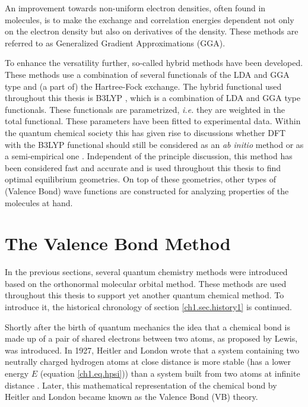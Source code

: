 An improvement towards non-uniform electron densities, often found in molecules, is to make the exchange and correlation energies dependent not only on the electron density but also on derivatives of the density. These methods are referred to as Generalized Gradient Approximations (GGA).

To enhance the versatility further, so-called hybrid methods have been developed. These methods use a combination of several functionals of the LDA and GGA type and (a part of) the Hartree-Fock exchange. The hybrid functional used throughout this thesis is B3LYP \cite{b3lyp1,b3lyp2,b3lyp3}, which is a combination of LDA and GGA type functionals. These functionals are parametrized, \textit{i.e.} they are weighted in the total functional. These parameters have been fitted to experimental data. Within the quantum chemical society this has given rise to discussions whether DFT with the B3LYP functional should still be considered as an \textit{ab initio} method or as a semi-empirical one \cite{jensen}. Independent of the principle discussion, this method has been considered fast and accurate and is used throughout this thesis to find optimal equilibrium geometries. On top of these geometries, other types of (Valence Bond) wave functions are constructed for analyzing properties of the molecules at hand.

\section{The Valence Bond Method}

In the previous sections, several quantum chemistry methods were introduced based on the orthonormal molecular orbital method. These methods are used throughout this thesis to support yet another quantum chemical method. To introduce it, the historical chronology of section \ref{ch1.sec.history1} is continued.

Shortly after the birth of quantum mechanics the idea that a chemical bond is made up of a pair of shared electrons between two atoms, as proposed by Lewis, was introduced. In 1927, Heitler and London wrote that a system containing two neutrally charged hydrogen atoms at close distance is more stable (has a lower energy $E$ (equation \ref{ch1.eq.hpsi})) than a system built from two atoms at infinite distance \cite{heitler}. Later, this mathematical representation of the chemical bond by Heitler and London became known as the Valence Bond (VB) theory. 

